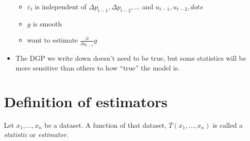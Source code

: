 \begin{itemize}
  \begin{itemize}
  \item $\varepsilon_t$ is independent of $\Delta p_{t-1}, \Delta p_{t-2}, \dots$ and $u_{t-1}, u_{t-2}, dots$
  \item $g$ is smooth
  \item want to estimate $\frac{\partial}{\partial u_{t-1}} g$
  \end{itemize}

\item The DGP we write down doesn't need to be true, but some
  statistics will be more sensitive than others to how ``true'' the
  model is.

\end{itemize}

\section{Definition of estimators}
Let $x_1,\dots,x_n$ be a dataset.  A function of that dataset,
$T(x_1,\dots,x_n)$ is called a \emph{statistic} or \emph{estimator}.

